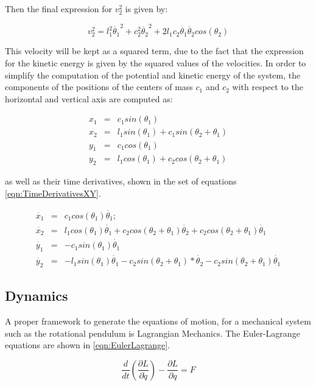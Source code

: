 \documentclass[main.tex]{subfiles}
\begin{document}
Then the final expression for $v_2^2$ is given by:

\begin{equation} 
v_2^2=l_1^2\dot{\theta_1}^2+c_2^2\dot{\theta_2}^2+2l_1c_2\dot{\theta_1}\dot{\theta_2}cos(\theta_2)
\end{equation}

This velocity will be kept as a squared term, due to the fact that the expression for the kinetic energy is given by the squared values of the velocities. In order to simplify the computation of the potential and kinetic energy of the system, the components of the positions of the centers of mass $c_1$ and $c_2$ with respect to the horizontal and vertical axis are computed as:


\begin{eqnarray}
x_1 &=& c_1 sin(\theta_1) \nonumber\\
x_2 &=& l_1 sin(\theta_1) + c_1 sin(\theta_2 + \theta_1) \nonumber\\
y_1 &=& c_1 cos(\theta_1) \nonumber\\
y_2 &=& l_1 cos(\theta_1) + c_2 cos(\theta_2 + \theta_1) 
\end{eqnarray}

as well as their time derivatives, shown in the set of equations \ref{eqn:TimeDerivativesXY}.

\begin{eqnarray}\label{eqn:TimeDerivativesXY}
\dot{x_1} &=& c_1 cos(\theta_1) \dot{\theta_1}; \nonumber\\
\dot{x_2} &=& l_1 cos(\theta_1) \dot{\theta_1} + c_2 cos(\theta_2 + \theta_1) \dot{\theta_2} + c_2 cos(\theta_2 + \theta_1)\dot{\theta_1} \nonumber\\
\dot{y_1} &=& -c_1 sin(\theta_1) \dot{\theta_1} \nonumber\\
\dot{y_2} &=& -l_1 sin(\theta_1) \dot{\theta_1} - c_2 sin(\theta_2 + \theta_1)*\dot{\theta_2} - c_2 sin(\theta_2 + \theta_1)\dot{\theta_1} 
\end{eqnarray}

\subsection{Dynamics}\label{math}


A proper framework to generate the equations of motion, for a mechanical system such as the rotational pendulum is Lagrangian Mechanics. The Euler-Lagrange equations are shown in \ref{eqn:EulerLagrange}.

\begin{equation}\label{eqn:EulerLagrange} 
\frac{d}{dt}\left(\frac{\partial L}{\partial \dot{q}}\right) - \frac{\partial L}{\partial q} = F
\end{equation}
\end{document}
